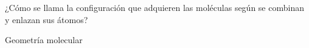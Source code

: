 \question[10] ¿Cómo se llama la configuración que adquieren las moléculas según se combinan y enlazan sus átomos?

\begin{solutionbox}{1cm}
    Geometría molecular
\end{solutionbox}